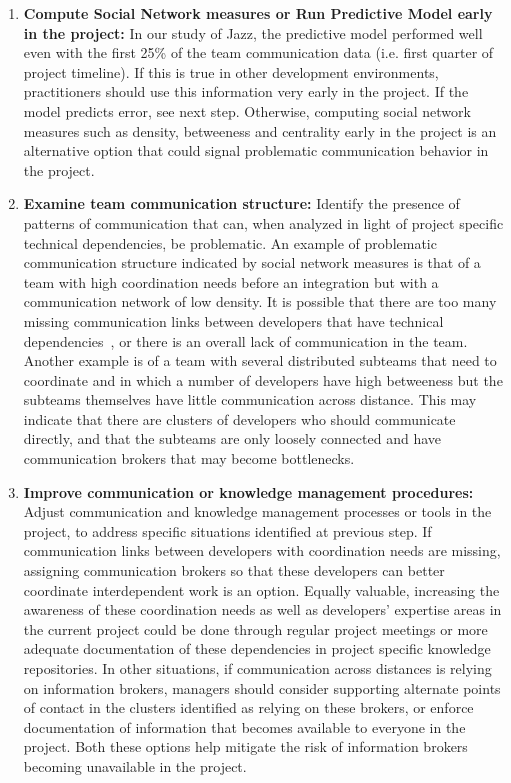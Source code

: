 \documentclass[12pt,oneside]{book}
\begin{document}
\begin{enumerate}
\item \textbf{Compute Social Network measures or Run Predictive Model early in
the project:} In our study of Jazz, the predictive model performed well even
with the first 25\% of the team communication data (i.e. first quarter of
project timeline). If this is true in other development environments,
practitioners should use this information very early in the project. If the
model predicts error, see next step. Otherwise, computing social network measures such as
density, betweeness and centrality early in the project is an alternative
option that could signal problematic communication behavior in the project.
\item \textbf{Examine team communication structure:}
Identify the presence of patterns of communication that can, when analyzed in
light of project specific technical dependencies, be problematic. An example of
problematic communication structure indicated by social network
measures is that of a team with high coordination needs before an integration
but with a communication network of low density. It is possible that there are too many missing communication links between developers that have
technical dependencies~\cite{ehrlich2008:gaps}, or
there is an overall lack of communication in the team. Another example is of a team with several
distributed subteams that need to coordinate and in which a number of
developers have high betweeness but the subteams themselves have little
communication across distance. This may indicate that there are
clusters of developers who should communicate directly, and that
the subteams are only loosely connected and have communication brokers that
may become bottlenecks. 
\item \textbf{Improve communication or knowledge management
procedures:} Adjust communication and knowledge management processes or tools in
the project, to address specific situations identified at previous step. 
If communication links between developers with
coordination needs are missing, assigning communication brokers so that
these developers can better coordinate interdependent work is an
option. Equally valuable, increasing the awareness of these coordination needs
as well as developers' expertise areas in the current project could be done
through regular project meetings or more adequate documentation of these dependencies in project specific knowledge repositories. In other situations, if
communication across distances is relying on information brokers, managers
should consider supporting alternate points of contact in the clusters
identified as relying on these brokers, or enforce documentation of information
that becomes available to everyone in the project. Both these options help
mitigate the risk of information brokers becoming unavailable in the project. 
\end{enumerate}
\end{document}
